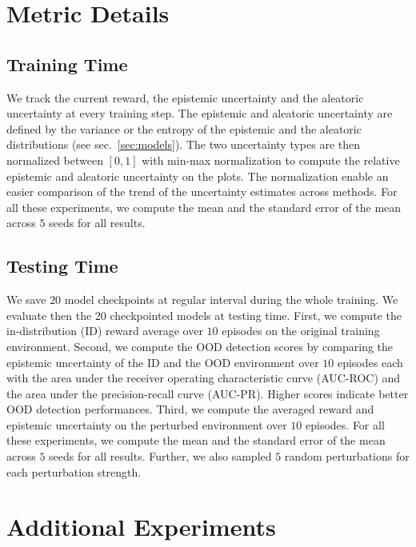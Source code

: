 \section{Metric Details}
\subsection{Training Time}
\label{app:training-time-metric-details}

We track the current reward, the epistemic uncertainty and the aleatoric uncertainty at every training step. The epistemic and aleatoric uncertainty are defined by the variance or the entropy of the epistemic and the aleatoric distributions (see sec.~\ref{sec:models}).  The two uncertainty types are then normalized between $[0, 1]$ with min-max normalization to compute the relative epistemic and aleatoric uncertainty on the plots. The normalization enable an easier comparison of the trend of the uncertainty estimates across methods. For all these experiments, we compute the mean and the standard error of the mean across $5$ seeds for all results.

\subsection{Testing Time}
\label{app:testing-time-metric-details}

We save $20$ model checkpoints at regular interval during the whole training. We evaluate then the $20$ checkpointed models at testing time. First, we compute the in-distribution (ID) reward average over $10$ episodes on the original training environment. Second, we compute the OOD detection scores by comparing the epistemic uncertainty of the ID and the OOD environment over $10$ episodes each with the area under the receiver operating characteristic curve (AUC-ROC) and the area under the precision-recall curve (AUC-PR). Higher scores indicate better OOD detection performances. Third, we compute the averaged reward and epistemic uncertainty on the perturbed environment over $10$ episodes. For all these experiments, we compute the mean and the standard error of the mean across $5$ seeds for all results. Further, we also sampled $5$ random perturbations for each perturbation strength.

\section{Additional Experiments}
\label{app:additional-experiments}

